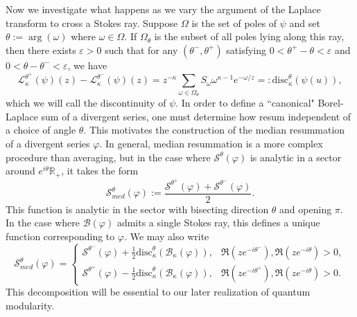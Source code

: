 \documentclass[12pt]{amsart}
\theoremstyle{definition}
\theoremstyle{plain}
\numberwithin{equation}{section}
\begin{document}
Now we investigate what happens as we vary the argument of the Laplace transform to cross a Stokes ray. Suppose $\Omega$ is the set of poles of $\psi$ and set $\theta := \arg(\omega)$ where $\omega \in \Omega$. If $\Omega_\theta$ is the subset of all poles lying along this ray, then there exists $\varepsilon>0$ such that for any $(\theta^-, \theta^+)$ satisfying $0<\theta^+ - \theta < \varepsilon$ and $0< \theta - \theta^- < \varepsilon$, we have
\[\mathcal{L}_\kappa^{\theta^+}(\psi)(z)-\mathcal{L}_\kappa^{\theta^-}(\psi)(z) = z^{-\kappa}\sum_{\omega \in \Omega_\theta} S_\omega \omega^{\kappa-1} e^{-\omega/z} =: \text{disc}_\kappa^\theta(\psi(u)),
\]
which we will call the discontinuity of $\psi$. 
In order to define a ``canonical" Borel-Laplace sum of a divergent series, one must determine how resum independent of a choice of angle $\theta$. This motivates the construction of the median resummation of a divergent series $\varphi$. 
In general, median resummation is a more complex procedure than averaging, but in the case where $\mathcal{S}^{\theta}(\varphi)$ is analytic in a sector around $e^{i\theta}\mathbb{R}_+$, it takes the form 
\[\mathcal{S}_{med}^\theta(\varphi):=\frac{\mathcal{S}^{\theta^+}(\varphi) + \mathcal{S}^{\theta^-}(\varphi)}{2}.\] 
This function is analytic in the sector with bisecting direction $\theta$ and opening $\pi$. In the case where $\mathcal{B}(\varphi)$ admits a single Stokes ray, this defines a unique function corresponding to $\varphi$. We may also write
\[\mathcal{S}_{med}^\theta(\varphi)=\begin{cases} \mathcal{S}^{\theta^-}(\varphi) + \frac{1}{2}\text{disc}_{\kappa}^\theta(\mathcal{B}_{\kappa}(\varphi)), & \Re(ze^{-i\theta^-}), \Re(ze^{-i\theta})>0, \\
\mathcal{S}^{\theta^+}(\varphi) - \frac{1}{2}\text{disc}_{\kappa}^\theta(\mathcal{B}_{\kappa}(\varphi)), & \Re(ze^{-i\theta^+}), \Re(ze^{-i\theta})>0.
\end{cases}
\] 
This decomposition will be essential to our later realization of quantum modularity. 


\end{document}
